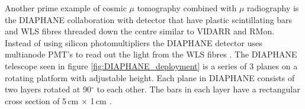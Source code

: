 Another prime example of cosmic $\mu$ tomography combined with $\mu$ radiography is the DIAPHANE collaboration with detector that have plastic scintillating bars and WLS fibres threaded down the centre similar to VIDARR and RMon. Instead of using silicon photomultipliers the DIAPHANE detector uses multianode PMT’s to read out the light from the WLS fibres \cite{Marteau_2017}. The DIAPHANE telescope seen in figure \ref{fig:DIAPHANE_deployment} is a series of 3 planes on a rotating platform with adjustable height. Each plane in DIAPHANE consists of two layers rotated at 90$^\circ$ to each other. The bars in each layer have a rectangular cross section of 5\,cm $\times$ 1\,cm \cite{MARTEAU201223}. 
